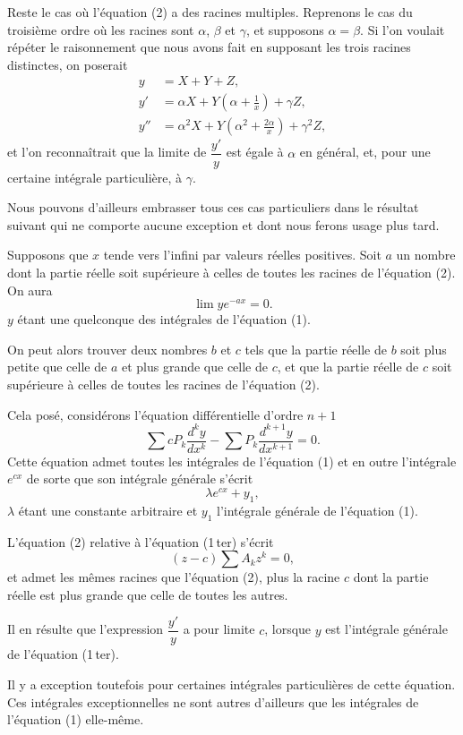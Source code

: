 \documentclass[11pt]{article}
\begin{document}
Reste le cas où l'équation (2) a des racines multiples. Reprenons le cas du troisième ordre où les racines sont $\alpha$, $\beta$ et $\gamma$, et supposons $\alpha=\beta$. Si l'on voulait répéter le raisonnement que nous avons fait en supposant les trois racines distinctes, on poserait
\[
\begin{aligned}
y&=X+Y+Z,\\
y'&=\alpha X+Y\left(\alpha+\frac1x\right)+\gamma Z,\\
y''&=\alpha^2X+Y\left(\alpha^2+\frac{2\alpha}{x}\right)+\gamma^2Z,
\end{aligned}
\]
et l'on reconnaîtrait que la limite de $\dfrac{y'}{y}$ est égale à $\alpha$ en général, et, pour une certaine intégrale particulière, à $\gamma$.

Nous pouvons d'ailleurs embrasser tous ces cas particuliers dans le résultat suivant qui ne comporte aucune exception et dont nous ferons usage plus tard.

Supposons que $x$ tende vers l'infini par valeurs réelles positives. Soit $a$ un nombre dont la partie réelle soit supérieure à celles de toutes les racines de l'équation (2). On aura
\[
\lim ye^{-ax}=0.
\]
$y$ étant une quelconque des intégrales de l'équation (1).

On peut alors trouver deux nombres $b$ et $c$ tels que la partie réelle de $b$ soit plus petite que celle de $a$ et plus grande que celle de $c$, et que la partie réelle de $c$ soit supérieure à celles de toutes les racines de l'équation (2).

Cela posé, considérons l'équation différentielle d'ordre $n+1$
\[
\tag{1\,ter}
\sum cP_k\frac{d^ky}{dx^k}-\sum P_k\frac{d^{k+1}y}{dx^{k+1}}=0.
\]
Cette équation admet toutes les intégrales de l'équation (1) et en outre l'intégrale $e^{cx}$ de sorte que son intégrale générale s'écrit
\[
\lambda e^{cx}+y_1,
\]
$\lambda$ étant une constante arbitraire et $y_1$ l'intégrale générale de l'équation (1).

L'équation (2) relative à l'équation (1\,ter) s'écrit
\[
\tag{2\,ter}
(z-c)\sum A_kz^k=0,
\]
et admet les mêmes racines que l'équation (2), plus la racine $c$ dont la partie réelle est plus grande que celle de toutes les autres.

Il en résulte que l'expression $\dfrac{y'}{y}$ a pour limite $c$, lorsque $y$ est l'intégrale générale de l'équation (1\,ter).

Il y a exception toutefois pour certaines intégrales particulières de cette équation. Ces intégrales exceptionnelles ne sont autres d'ailleurs que les intégrales de l'équation (1) elle-même.
\end{document}
